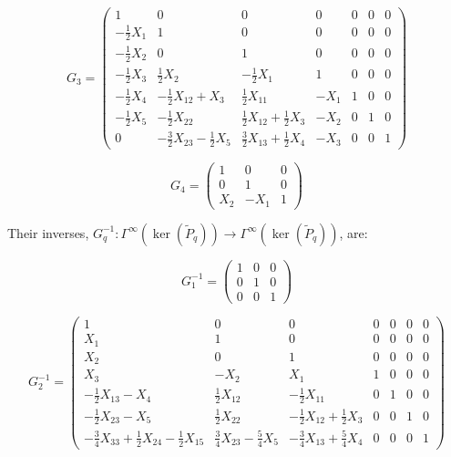 \documentclass[reqno,12pt]{amsart}
\theoremstyle{plain}
\theoremstyle{definition}
\begin{document}
$$
G_3=\left(\begin{array}{c|cc|c|cc|c}
1&      0&                0&               0&  0&0&0\\\hline
-\tfrac12X_1&1&                0&               0&  0&0&0\\
-\tfrac12X_2&0&                1&               0&  0&0&0\\\hline
-\tfrac12X_3&\tfrac12X_2&           -\tfrac12X_1&         1&  0&0&0\\\hline
-\tfrac12X_4&-\tfrac12X_{12}+X_3&    \tfrac12X_{11}&        -X_1&1&0&0\\
-\tfrac12X_5&-\tfrac12X_{22}&        \tfrac12X_{12}+\tfrac12X_3&-X_2&0&1&0\\\hline
0&      -\tfrac32X_{23}-\tfrac12X_5&\tfrac32X_{13}+\tfrac12X_4&-X_3&0&0&1 
\end{array}\right)
$$

$$
G_4=\left(\begin{array}{cc|c}
1& 0&  0\\
0& 1&  0\\\hline
X_2&-X_1&1 
\end{array}\right)
$$

Their inverses, $G_q^{-1}\colon\Gamma^\infty(\ker(\tilde P_q))\to\Gamma^\infty(\ker(\tilde P_q))$, are:

$$
G^{-1}_1=\left(\begin{array}{c|cc}
1&0&0\\\hline
0&1&0\\
0&0&1 
\end{array}\right)
$$

$$
G^{-1}_2=\left(\begin{array}{c|cc|c|cc|c}
1&                            0&               0&                0&0&0&0\\\hline
X_1&                           1&               0&                0&0&0&0\\
X_2&                           0&               1&                0&0&0&0\\\hline
X_3&                           -X_2&             X_1&               1&0&0&0\\\hline
-\tfrac12X_{13}-X_4&                \tfrac12X_{12}&       -\tfrac12X_{11}&        0&1&0&0\\
-\tfrac12X_{23}-X_5&                \tfrac12X_{22}&        -\tfrac12X_{12}+\tfrac12X_3&0&0&1&0\\\hline
-\tfrac34X_{33}+\tfrac12X_{24}-\tfrac12X_{15}&\tfrac34X_{23}-\tfrac54X_5&-\tfrac34X_{13}+\tfrac54X_4&0&0&0&1 
\end{array}\right)
$$
\end{document}
